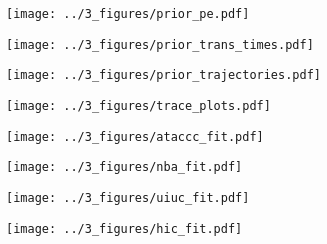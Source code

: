 
\begin{appendix}

    \renewcommand{\thefigure}{A\arabic{figure}}
    \setcounter{figure}{0}
    
    \renewcommand{\thetable}{A\arabic{table}}
    \setcounter{table}{0}
    
    \renewcommand{\theequation}{A\arabic{equation}}
    \setcounter{equation}{0}

    \newpage

    \begin{figure}[p]
        \centering
        \texttt{[image: ../3\_figures/prior\_pe.pdf]}
        \caption{}
    \end{figure}
    
    \begin{figure}[p]
        \centering
        \texttt{[image: ../3\_figures/prior\_trans\_times.pdf]}
        \caption{}
    \end{figure}
    
    \begin{figure}[p]
        \centering
        \texttt{[image: ../3\_figures/prior\_trajectories.pdf]}
        \caption{}
    \end{figure}
    
    \begin{figure}[p]
        \centering
        \texttt{[image: ../3\_figures/trace\_plots.pdf]}
        \caption{}
    \end{figure}

    \begin{landscape}
        \begin{figure}[p]
            \centering
            \texttt{[image: ../3\_figures/ataccc\_fit.pdf]}
            \caption{}
        \end{figure}
        
        \begin{figure}[p]
            \centering
            \texttt{[image: ../3\_figures/nba\_fit.pdf]}
            \caption{}
        \end{figure}
    
        \begin{figure}[p]
            \centering
            \texttt{[image: ../3\_figures/uiuc\_fit.pdf]}
            \caption{}
        \end{figure}
    
        \begin{figure}[p]
            \centering
            \texttt{[image: ../3\_figures/hic\_fit.pdf]}
            \caption{}
        \end{figure}
    \end{landscape}
    


\end{appendix}
